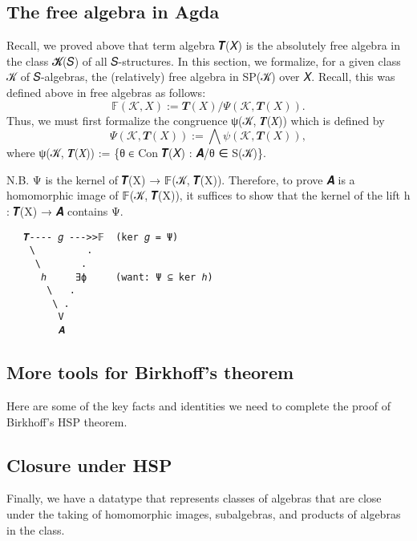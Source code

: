 \documentclass[sigplan,screen]{acmart}
\begin{document}
\subsection{The free algebra in Agda}\label{the-free-algebra-in-agda}
Recall, we proved above that term algebra 𝑻(𝑋) is the absolutely free algebra in the class 𝓚(𝑆) of all 𝑆-structures. In this section, we formalize, for a given class 𝒦 of 𝑆-algebras, the (relatively) free algebra in SP(𝒦) over 𝑋. Recall, this was defined above in free algebras as follows:
\[𝔽(𝒦, 𝑋) := 𝑻(𝑋)/Ψ(𝒦, 𝑻(𝑋)).\]
Thus, we must first formalize the congruence ψ(𝒦, 𝑻(𝑋)) which is defined by
\[Ψ(𝒦, 𝑻(𝑋)) := ⋀ ψ(𝒦, 𝑻(𝑋)),\]
where ψ(𝒦, 𝑻(𝑋)) := \{θ ∈ Con 𝑻(𝑋) : 𝑨/θ ∈ S(𝒦)\}.
\begin{code}\end{code}

N.B. Ψ is the kernel of 𝑻(X) → 𝔽(𝒦, 𝑻(X)). Therefore, to prove 𝑨 is a homomorphic image of 𝔽(𝒦, 𝑻(X)), it suffices to show that the kernel of the lift h : 𝑻(X) → 𝑨 contains Ψ.

\begin{verbatim}
   𝑻---- 𝑔 --->>𝔽  (ker 𝑔 = Ψ)
    \         .
     \       .
      ℎ     ∃ϕ     (want: Ψ ⊆ ker ℎ)
       \   .
        \ .
         V
         𝑨
\end{verbatim}

\subsection{More tools for Birkhoff's theorem}\label{more-tools-for-birkhoffs-theorem}
Here are some of the key facts and identities we need to complete the proof of Birkhoff's HSP theorem.
\begin{code}\end{code}


\subsection{Closure under HSP}\label{closure-under-hsp}
Finally, we have a datatype that represents classes of algebras that are close under the taking of homomorphic images, subalgebras, and products of algebras in the class.
\end{document}
